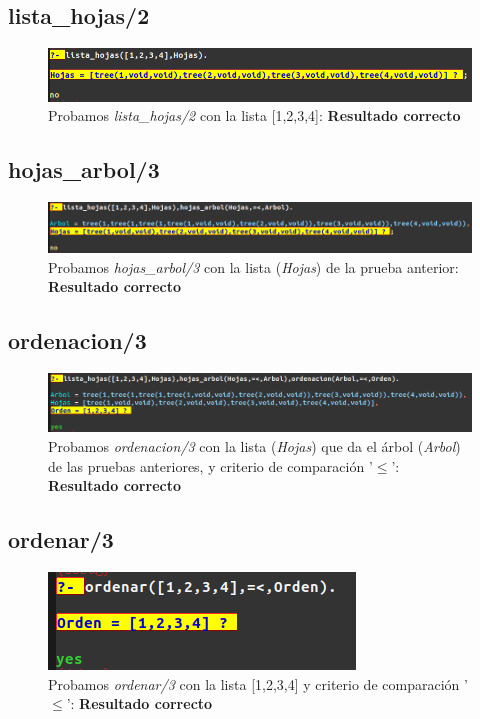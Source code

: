 \documentclass[12pt, a4paper, spanish]{article}
\begin{document}
\subsection{lista\_hojas/2}
\begin{figure}[H]
	\centering
	\includegraphics[scale=0.6]{images/listaHojas.png}
	\caption{Probamos \textit{lista\_hojas/2} con la lista [1,2,3,4]: \textbf{Resultado correcto}}
\end{figure}

\subsection{hojas\_arbol/3}
\begin{figure}[H]
	\centering
	\includegraphics[scale=0.5]{images/hojasArbol.png}
	\caption{Probamos \textit{hojas\_arbol/3} con la lista (\textit{Hojas}) de la prueba anterior: \textbf{Resultado correcto}}
\end{figure}


\subsection{ordenacion/3}
\begin{figure}[H]
	\centering
	\includegraphics[scale=0.5]{images/ordenacion.png}
	\caption{Probamos \textit{ordenacion/3} con la lista (\textit{Hojas}) que da el árbol (\textit{Arbol}) de las pruebas anteriores, y criterio de comparación '$\leq$': \textbf{Resultado correcto}}
\end{figure}


\subsection{ordenar/3}
\begin{figure}[H]
	\centering
	\includegraphics{images/ordenar.png}
	\caption{Probamos \textit{ordenar/3} con la lista [1,2,3,4] y criterio de comparación '$\leq$': \textbf{Resultado correcto}}
\end{figure}
\end{document}
